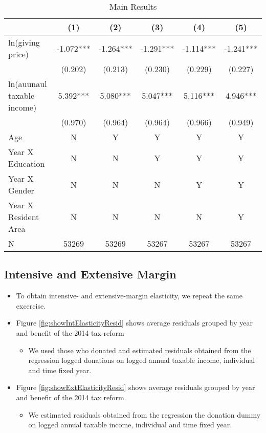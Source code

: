 \documentclass[ review  , 3p ]{elsarticle}
\providecommand{\tightlist}{%
  \setlength{\itemsep}{0pt}\setlength{\parskip}{0pt}}
\begin{document}
  \begin{table}
  
  \caption{\label{tab:kableEstimateElasticityPart1}Main Results}
  \centering
  \fontsize{7}{9}\selectfont
  \begin{tabular}[t]{lccccc}
  \toprule
   & (1) & (2) & (3) & (4) & (5)\\
  \midrule
  ln(giving price) & -1.072*** & -1.264*** & -1.291*** & -1.114*** & -1.241***\\
   & (0.202) & (0.213) & (0.230) & (0.229) & (0.227)\\
  ln(auunaul taxable income) & 5.392*** & 5.080*** & 5.047*** & 5.116*** & 4.946***\\
   & (0.970) & (0.964) & (0.964) & (0.966) & (0.949)\\
  Age & N & Y & Y & Y & Y\\
  Year X Education & N & N & Y & Y & Y\\
  Year X Gender & N & N & N & Y & Y\\
  Year X Resident Area & N & N & N & N & Y\\
  N & 53269 & 53269 & 53267 & 53267 & 53267\\
  \bottomrule
  \end{tabular}
  \end{table}
  
  \hypertarget{intensive-and-extensive-margin}{%
  \subsection{Intensive and Extensive Margin}\label{intensive-and-extensive-margin}}
  
  \begin{itemize}
  \tightlist
  \item
    To obtain intensive- and extensive-margin elasticity, we repeat the same excercise.
  \item
    Figure \ref{fig:showIntElasticityResid} shows average residuals grouped by year and benefit of the 2014 tax reform
  
    \begin{itemize}
    \tightlist
    \item
      We used those who donated and estimated residuals obtained from the regression logged donations on logged annual taxable income, individual and time fixed year.
    \end{itemize}
  \item
    Figure \ref{fig:showExtElasticityResid} shows average residuals grouped by year and benefir of the 2014 tax reform.
  
    \begin{itemize}
    \tightlist
    \item
      We estimated residuals obtained from the regression the donation dummy on logged annual taxable income, individual and time fixed year.
    \end{itemize}
  \end{itemize}
  
\end{document}
